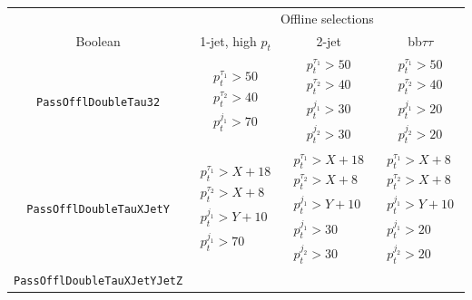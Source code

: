 \documentclass[../main.tex]{subfiles}
\begin{document}
\begin{table}
	\begin{center}
	\begin{tabular}{c || c | c | c }
		                           & \multicolumn{3}{c}{Offline selections} \\
		Boolean                    & 1-jet, high $p_t$ & 2-jet & bb$\tau\tau$ \\\hline\hline
		\texttt{PassOfflDoubleTau32} & 
			$\begin{matrix}
				p_t^{\tau_1}>50\\
				p_t^{\tau_2}>40\\
				p_t^{j_1}>70
			\end{matrix}$ &
			$\begin{matrix}
				p_t^{\tau_1}>50\\
				p_t^{\tau_2}>40\\
				p_t^{j_1}>30 \\
				p_t^{j_2}>30
			\end{matrix}$ &
			$\begin{matrix}
				p_t^{\tau_1}>50\\
				p_t^{\tau_2}>40\\
				p_t^{j_1}>20\\
				p_t^{j_2}>20
			\end{matrix}$ \\\hline
		\texttt{PassOfflDoubleTauXJetY} &
			$\begin{matrix}
				p_t^{\tau_1}>X+18\\
				p_t^{\tau_2}>X+8\\
				p_t^{j_1}>Y+10 \\
				p_t^{j_1}>70
			\end{matrix}$ &
			$\begin{matrix}
				p_t^{\tau_1}>X+18\\
				p_t^{\tau_2}>X+8\\
				p_t^{j_1}>Y+10 \\
				p_t^{j_1}>30 \\
				p_t^{j_2}>30
			\end{matrix}$ &
			$\begin{matrix}
				p_t^{\tau_1}>X+8\\
				p_t^{\tau_2}>X+8\\
				p_t^{j_1}>Y+10 \\
				p_t^{j_1}>20 \\
				p_t^{j_2}>20
			\end{matrix}$ \\\hline
		\texttt{PassOfflDoubleTauXJetYJetZ} &

\end{tabular}
\end{center}
\end{table}
\end{document}
